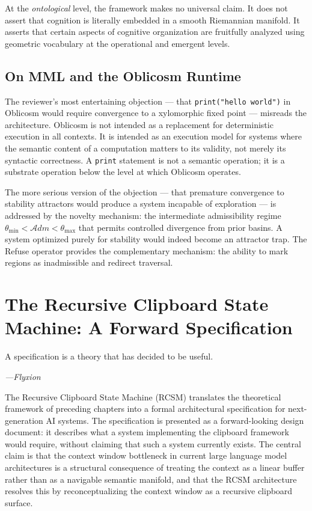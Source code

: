 \documentclass[12pt,oneside]{book}
\theoremstyle{plain}
\theoremstyle{definition}
\theoremstyle{plain}
\begin{document}
At the \emph{ontological} level, the framework makes no universal claim. It does not assert that cognition is literally embedded in a smooth Riemannian manifold. It asserts that certain aspects of cognitive organization are fruitfully analyzed using geometric vocabulary at the operational and emergent levels.

\section{On MML and the Oblicosm Runtime}

The reviewer's most entertaining objection — that \texttt{print("hello world")} in Oblicosm would require convergence to a xylomorphic fixed point — misreads the architecture. Oblicosm is not intended as a replacement for deterministic execution in all contexts. It is intended as an execution model for systems where the semantic content of a computation matters to its validity, not merely its syntactic correctness. A \texttt{print} statement is not a semantic operation; it is a substrate operation below the level at which Oblicosm operates.

The more serious version of the objection — that premature convergence to stability attractors would produce a system incapable of exploration — is addressed by the novelty mechanism: the intermediate admissibility regime $\theta_{\min} < \mathcal{A}dm < \theta_{\max}$ that permits controlled divergence from prior basins. A system optimized purely for stability would indeed become an attractor trap. The Refuse operator provides the complementary mechanism: the ability to mark regions as inadmissible and redirect traversal.

\chapter{The Recursive Clipboard State Machine: A Forward Specification}
\label{ch:rcsm}

\epigraph{A specification is a theory that has decided to be useful.}{\textit{---Flyxion}}

The Recursive Clipboard State Machine (RCSM) translates the theoretical framework of preceding chapters into a formal architectural specification for next-generation AI systems. The specification is presented as a forward-looking design document: it describes what a system implementing the clipboard framework would require, without claiming that such a system currently exists. The central claim is that the context window bottleneck in current large language model architectures is a structural consequence of treating the context as a linear buffer rather than as a navigable semantic manifold, and that the RCSM architecture resolves this by reconceptualizing the context window as a recursive clipboard surface.
\end{document}
